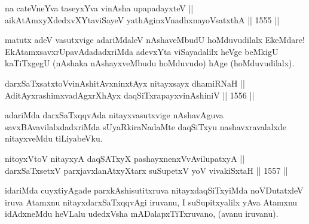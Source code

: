 
\begin{shl}
na ca\footnotemark[2] teVneYva taseyxYva vinAsha upapadayxteV || \\
aikAtAmxyXdedxvXYtaviSayeV yathA\s ginxVnadhxnayoVsatxthA \hfill || 1555 ||  
\end{shl}

\begin{artha}
matutx adeV vasutxvige adariMdaleV nAshaveMbudU hoMduvudilalx EkeMdare! EkAtamxsavxrUpavAdadadxriMda adevxYta viSayadalilx heVge beMkigU kaTiTxgegU (nAshaka nAshayxveMbudu hoMduvudo) hAge (hoMduvudilalx).
\end{artha}


\begin{shl}
\footnotemark[3]darxSaTxsatxtoV\s vinAshitAvxninxtAyx nitayxsayx dhamiRNaH ||  \\
AditAyxrashimxvadAgxrXhAyx daqSiTxrapayxvinAshiniV \hfill || 1556 ||
\end{shl}

\begin{artha}
adariMda darxSaTxqqvAda nitayxvasutxvige nAshavAguva savxBAvavilalxdadxriMda sUyaRkiraNadaMte daqSiTxyu nashavxravalalxde nitayxveMdu tiLiyabeVku.
\end{artha}


\begin{shl}
nitoyxV\s toV nitayxyA daqSATxyX pashayxnenxVvAvilupatxyA || \\
darxSaTx\s \s setxV parxjavxlanAtxyX\s tarx suSupetxV yoV vivakiSxtaH \hfill || 1557 ||  
\end{shl}

\begin{artha}
idariMda cuyxtiyAgade parxkAshisutitxruva nitayxdaqSiTxyiMda noVDutatxleV iruva Atamxnu nitayxdarxSaTxqqvAgi iruvanu, I suSupitxyalilx yAva Atamxnu idAdxneMdu heVLalu udedxVsha mADalapxTiTxruvano, (avanu iruvanu).
\end{artha}


